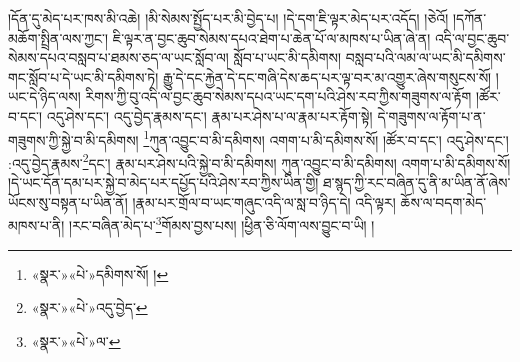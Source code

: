 །དོན་དུ་མེད་པར་ཁས་མི་འཆེ། །མི་སེམས་སྤྱོད་པར་མི་བྱེད་པ། །དེ་དག་ཇི་ལྟར་མེད་པར་འདོད། །ཅེའོ། །དཀོན་མཆོག་སྤྲིན་ལས་ཀྱང་། ཇི་ལྟར་ན་བྱང་ཆུབ་སེམས་དཔའ་ཐེག་པ་ཆེན་པོ་ལ་མཁས་པ་ཡིན་ཞེ་ན། འདི་ལ་བྱང་ཆུབ་སེམས་དཔའ་བསླབ་པ་ཐམས་ཅད་ལ་ཡང་སློབ་ལ། སློབ་པ་ཡང་མི་དམིགས། བསླབ་པའི་ལམ་ལ་ཡང་མི་དམིགས་གང་སློབ་པ་དེ་ཡང་མི་དམིགས་ཏེ། རྒྱུ་དེ་དང་རྐྱེན་དེ་དང་གཞི་དེས་ཆད་པར་ལྟ་བར་མ་འགྱུར་ཞེས་གསུངས་སོ། །ཡང་དེ་ཉིད་ལས། རིགས་ཀྱི་བུ་འདི་ལ་བྱང་ཆུབ་སེམས་དཔའ་ཡང་དག་པའི་ཤེས་རབ་ཀྱིས་གཟུགས་ལ་རྟོག །ཚོར་བ་དང་། འདུ་ཤེས་དང་། འདུ་བྱེད་རྣམས་དང་། རྣམ་པར་ཤེས་པ་ལ་རྣམ་པར་རྟོག་སྟེ། དེ་གཟུགས་ལ་རྟོག་པ་ན་གཟུགས་ཀྱི་སྐྱེ་བ་མི་དམིགས། \footnote{«སྣར་»«པེ་»དམིགས་སོ། ། }ཀུན་འབྱུང་བ་མི་དམིགས། འགག་པ་མི་དམིགས་སོ། །ཚོར་བ་དང་། འདུ་ཤེས་དང་། :འདུ་བྱེད་རྣམས་\footnote{«སྣར་»«པེ་»འདུ་བྱེད་}དང་། རྣམ་པར་ཤེས་པའི་སྐྱེ་བ་མི་དམིགས། ཀུན་འབྱུང་བ་མི་དམིགས། འགག་པ་མི་དམིགས་སོ། །དེ་ཡང་དོན་དམ་པར་སྐྱེ་བ་མེད་པར་དཔྱོད་པའི་ཤེས་རབ་ཀྱིས་ཡིན་གྱི། ཐ་སྙད་ཀྱི་རང་བཞིན་དུ་ནི་མ་ཡིན་ནོ་ཞེས་ཡོངས་སུ་བསྟན་པ་ཡིན་ནོ། །རྣམ་པར་གྲོལ་བ་ཡང་གཞུང་འདི་ལ་སླ་བ་ཉིད་དེ། འདི་ལྟར། ཆོས་ལ་བདག་མེད་མཁས་པ་ནི། །རང་བཞིན་མེད་པ་\footnote{«སྣར་»«པེ་»ལ་}གོམས་བྱས་པས། །ཕྱིན་ཅི་ལོག་ལས་བྱུང་བ་ཡི། །
